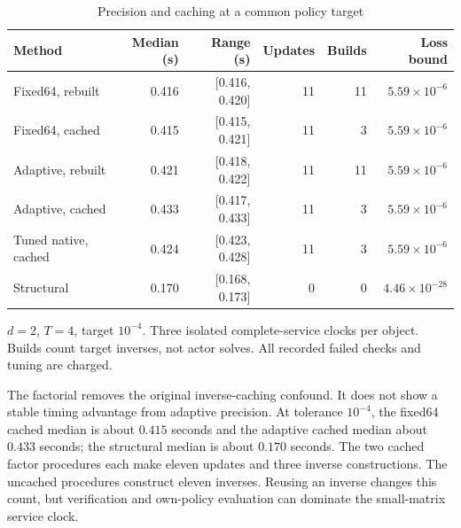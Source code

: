 \documentclass[ecta,nameyear,draft]{econsocart}
\theoremstyle{definition}
\theoremstyle{remark}
\begin{document}
\begin{table}[htbp]
\centering\small\setlength{\tabcolsep}{5pt}
\caption{Precision and caching at a common policy target}\label{tab:r39factorial}
\begin{tabular}{lrrrrr}
\toprule
Method & Median (s) & Range (s) & Updates & Builds & Loss bound\\
\midrule
Fixed64, rebuilt & 0.416 & [0.416, 0.420] & 11 & 11 & $5.59\times10^{-6}$\\
Fixed64, cached & 0.415 & [0.415, 0.421] & 11 & 3 & $5.59\times10^{-6}$\\
Adaptive, rebuilt & 0.421 & [0.418, 0.422] & 11 & 11 & $5.59\times10^{-6}$\\
Adaptive, cached & 0.433 & [0.417, 0.433] & 11 & 3 & $5.59\times10^{-6}$\\
Tuned native, cached & 0.424 & [0.423, 0.428] & 11 & 3 & $5.59\times10^{-6}$\\
Structural & 0.170 & [0.168, 0.173] & 0 & 0 & $4.46\times10^{-28}$\\
\bottomrule
\end{tabular}
\par\smallskip\begin{minipage}{.96\linewidth}\footnotesize $d=2$, $T=4$, target $10^{-4}$. Three isolated complete-service clocks per object. Builds count target inverses, not actor solves. All recorded failed checks and tuning are charged.\end{minipage}
\end{table}



The factorial removes the original inverse-caching confound. It does not show
a stable timing advantage from adaptive precision. At tolerance $10^{-4}$,
the fixed64 cached median is about $0.415$ seconds and the adaptive cached
median about $0.433$ seconds; the structural median is about $0.170$ seconds.
The two cached factor procedures each make eleven updates and three inverse
constructions. The uncached procedures construct eleven inverses. Reusing an
inverse changes this count, but verification and own-policy evaluation can
dominate the small-matrix service clock.
\end{document}
